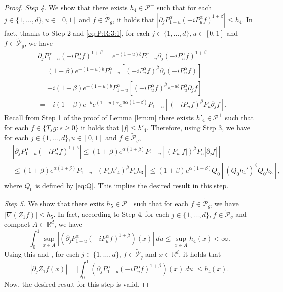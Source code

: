 \documentclass[12pt,a4paper]{amsart}
\theoremstyle{plain}
\theoremstyle{definition}
\numberwithin{equation}{section}
\begin{document}
\begin{proof}
  \emph{Step 4.} We show that there exists
   $h_{4} \in \mathcal P^+$
  such that for each $j \in \{1,\dots, d\}, u \in [0, 1]$ and $f \in \widetilde {\mathcal P}_g$, it holds that
  \(
    | \partial_j  P_{1-u}^\alpha (- i P_u^\alpha f)^{1+\beta} |
    \leq h_4.
  \)
  In fact, thanks to Step 2 and \eqref{eq:P:R:3:1}, for each $j \in \{1,\dots, d\}, u \in [0, 1]$ and $f \in \widetilde{\mathcal P}_g$, we have
\begin{align}
  & \partial_j  P_{1-u}^\alpha (- i P_u^\alpha f)^{1+\beta}
  = e^{-(1-u)b} P_{1-u}^\alpha \partial_j (- i P_u^\alpha f)^{1+\beta}
  \\ & = (1+\beta) e^{-(1-u)b} P_{1-u}^\alpha [ (- i P_u^\alpha f)^\beta \partial_j (- i P_u^\alpha f) ]
  \\ & = -i(1+\beta) e^{-(1-u)b} P_{1-u}^\alpha[ (- i P_u^\alpha f)^\beta e^{-ub} P_u^\alpha \partial_j f]
  \\ & = -i(1+\beta) e^{-b} e^{(1-u)\alpha} e^{u\alpha (1+\beta)} P_{1-u} [ (- i P_u f)^\beta P_u \partial_j f ].
\end{align}
Recall from Step 1 of the proof of Lemma \ref{lem:m} there exists
 $h'_4\in \mathcal P^+$ such that
for each $f \in \{T_sg:s\geq 0\}$ it holds that $|f| \leq h'_4$.
Therefore, using Step 3, we have for each $j \in \{1,\dots, d\}, u \in [0, 1]$ and $f \in \widetilde {\mathcal P}_g$,
\begin{align}
  & |\partial_j  P_{1-u}^\alpha (- i P_u^\alpha f)^{1+\beta}|
\leq (1+\beta) e^{\alpha (1+\beta)} P_{1-u} [  (P_u |f|)^\beta P_u |\partial_j f| ]
\\&    \leq (1+\beta) e^{\alpha (1+\beta)} P_{1-u} [  (P_u h'_4)^\beta P_u h_3 ]
     \leq (1+\beta) e^{\alpha (1+\beta)} Q_0 [  (Q_0 h_4')^\beta Q_0 h_3 ],
\end{align}
where $Q_0$ is defined by \eqref{eq:Q}.
This implies the desired result in this step.

 \emph{Step 5.} We show that there exits
  $h_5 \in \mathcal P^+$
 such that for each $f \in \widetilde {\mathcal P}_g$, we have $ |\nabla (Z_1f)| \leq h_5$.
In fact, according to Step 4, for each $j \in \{1,\dots, d\}$, $f \in \widetilde{\mathcal P}_g$ and compact $A \subset \mathbb R^d$, we have
\[
  \int_0^1 \sup_{x\in A} | (\partial_j  P_{1-u}^\alpha (-i P_u^\alpha f)^{1+\beta}) (x) |~du
  \leq \sup_{x\in A} h_4(x) < \infty.
\]
Using this and \cite[Theorem A.5.2]{Durrett2010Probability}, for each $j \in
\{1,\dots, d\}$, $f\in \widetilde {\mathcal P}_g$ and $x\in \mathbb R^d$, it holds that
\[
  | \partial_j Z_1 f(x)|
  =\Big| \int_0^1  ( \partial_jP_{1-u}^\alpha (-iP_u^\alpha f)^{1+\beta} ) (x) ~du  \Big|
  \leq h_4(x).
\]
Now, the desired result for this step is valid.


\end{proof}
\end{document}
